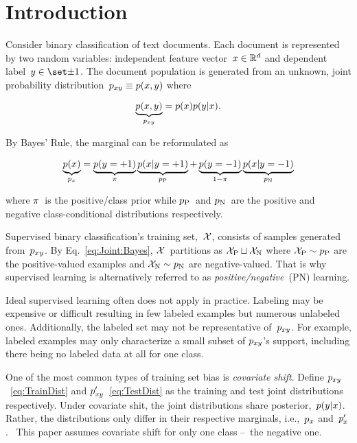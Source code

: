 \documentclass[]{subfiles}
\begin{document}
\section{Introduction}\label{sec:Introduction}

Consider binary classification of text documents.  Each document is represented by two random variables: independent feature vector~${x \in \mathbb{R}^{d}}$ and dependent label~${\y \in \domainY}$. The document population is generated from an unknown, joint probability distribution~${p_{xy} \equiv p(x,y)}$ where

\begin{equation}
  \underbrace{p(x,y)}_{p_{xy}} = p(x) p(y \vert x) \text{.} \label{eq:TrainDist}
\end{equation}

\noindent
By Bayes' Rule, the marginal can be reformulated as

\begin{equation}
  \underbrace{p(x)}_{p_{x}} = \underbrace{p(y = {+}1)}_{\pi} \underbrace{p(x \vert y = {+}1)}_{p_{\textnormal{P}}} + \underbrace{p(y = {-}1)}_{1-\pi} \underbrace{p(x \vert y = {-}1)}_{p_{\textnormal{N}}} \label{eq:Joint:Bayes}
\end{equation}

\noindent
where $\pi$~is the positive\-/class prior while $p_{\textnormal{P}}$~and $p_{\textnormal{N}}$~are the positive and negative class-conditional distributions respectively.

Supervised binary classification's training set,~$\mathcal{X}$, consists of samples generated from~$p_{xy}$. By Eq.~\eqref{eq:Joint:Bayes}, $\mathcal{X}$~partitions as ${\mathcal{X}_{\textnormal{P}} \sqcup \mathcal{X}_{\textnormal{N}}}$ where ${\mathcal{X}_{\textnormal{P}} \sim p_{\textnormal{P}}}$ are the positive-valued examples and ${\mathcal{X}_{\textnormal{N}} \sim p_{\textnormal{N}}}$ are negative-valued.  That is why supervised learning is alternatively referred to as \textit{positive\-/negative}~(PN) learning.

Ideal supervised learning often does not apply in practice.  Labeling may be expensive or difficult resulting in few labeled examples but numerous unlabeled ones.  Additionally, the labeled set may not be representative of~$p_{xy}$.  For example, labeled examples may only characterize a small subset of $p_{xy}$'s support, including there being no labeled data at all for one class.

One of the most common types of training set bias is \textit{covariate shift}. Define $p_{xy}$~\eqref{eq:TrainDist} and ${p_{xy}'}$~\eqref{eq:TestDist} as the training and test joint distributions respectively.  Under covariate shit, the joint distributions share posterior,~${p(y \vert x)}$. Rather, the distributions only differ in their respective marginals, i.e.,~${p_{x}}$ and~$p_{x}'$.~\cite{Huang:2006}  This paper assumes covariate shift for only one class --~the negative one.
\end{document}

